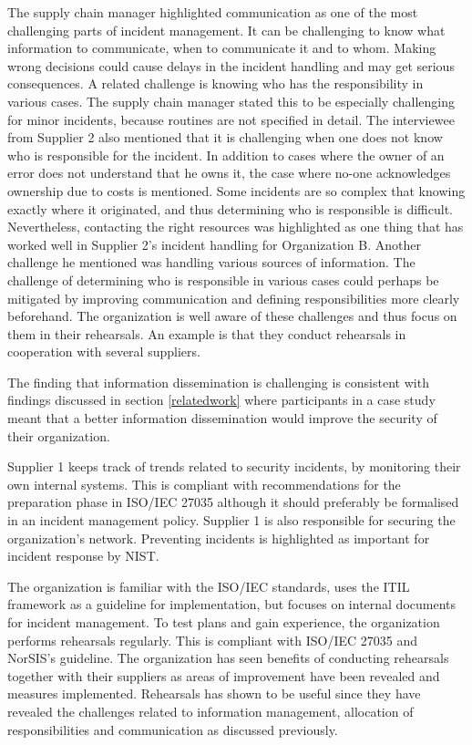 The supply chain manager highlighted communication as one of the most challenging parts of incident management. It can be challenging to know what information to communicate, when to communicate it and to whom. Making wrong decisions could cause delays in the incident handling and may get serious consequences. A related challenge is knowing who has the responsibility in various cases. The supply chain manager stated this to be especially challenging for minor incidents, because routines are not specified in detail. The interviewee from Supplier 2 also mentioned that it is challenging when one does not know who is responsible for the incident. In addition to cases where the owner of an error does not understand that he owns it, the case where no-one acknowledges ownership due to costs is mentioned. Some incidents are so complex that knowing exactly where it originated, and thus determining who is responsible is difficult. Nevertheless, contacting the right resources was highlighted as one thing that has worked well in Supplier 2's incident handling for Organization B. Another challenge he mentioned was handling various sources of information. The challenge of determining who is responsible in various cases could perhaps be mitigated by improving communication and defining responsibilities more clearly beforehand. The organization is well aware of these challenges and thus focus on them in their rehearsals. An example is that they conduct rehearsals in cooperation with several suppliers.

The finding that information dissemination is challenging is consistent with findings discussed in section \ref{relatedwork} where participants in a case study meant that a better information dissemination would improve the security of their organization. 

Supplier 1 keeps track of trends related to security incidents, by monitoring their own internal systems. This is compliant with recommendations for the preparation phase in ISO/IEC 27035 although it should preferably be formalised in an incident management policy. Supplier 1 is also responsible for securing the organization's network. Preventing incidents is highlighted as important for incident response by NIST.

The organization is familiar with the ISO/IEC standards, uses the ITIL framework as a guideline for implementation, but focuses on internal documents for incident management. To test plans and gain experience, the organization performs rehearsals regularly. This is compliant with ISO/IEC 27035 and NorSIS's guideline. The organization has seen benefits of conducting rehearsals together with their suppliers as areas of improvement have been revealed and measures implemented. Rehearsals has shown to be useful since they have revealed the challenges related to information management, allocation of responsibilities and communication as discussed previously.  

